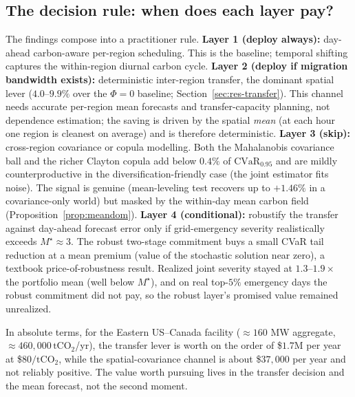 \documentclass[12pt]{article}
\newcommand{\CVaR}{\mathrm{CVaR}}
\begin{document}
\subsection{The decision rule: when does each layer pay?}\label{sec:practical}
The findings compose into a practitioner rule. \textbf{Layer 1 (deploy always):}
day-ahead carbon-aware per-region scheduling. This is the baseline; temporal shifting
captures the within-region diurnal carbon cycle. \textbf{Layer 2 (deploy if migration
bandwidth exists):} deterministic inter-region transfer, the dominant spatial lever
($4.0$--$9.9\%$ over the $\Phi=0$ baseline;
Section~\ref{sec:res-transfer}). This channel needs accurate per-region mean forecasts
and transfer-capacity planning, not dependence estimation; the saving is driven by the
spatial \emph{mean} (at each hour one region is cleanest on average) and is therefore
deterministic. \textbf{Layer 3 (skip):} cross-region covariance or copula modelling. Both
the Mahalanobis covariance ball and the richer Clayton copula add below $0.4\%$ of
$\CVaR_{0.95}$ and are mildly counterproductive in the diversification-friendly case
(the joint estimator fits noise). The signal is genuine (mean-leveling test recovers up to
$+1.46\%$ in a covariance-only world) but masked by the within-day mean carbon field
(Proposition~\ref{prop:meandom}). \textbf{Layer 4 (conditional):} robustify the
transfer against day-ahead forecast error only if grid-emergency severity realistically
exceeds $M^\star\approx3$. The robust two-stage commitment buys a small CVaR tail
reduction at a mean premium (value of the stochastic solution near zero), a textbook
price-of-robustness result. Realized joint severity stayed at $1.3$--$1.9\times$ the
portfolio mean (well below $M^\star$), and on real top-$5\%$ emergency days the robust
commitment did not pay, so the robust layer's promised value remained unrealized.

In absolute terms, for the Eastern US--Canada facility ($\approx160$ MW aggregate,
$\approx460{,}000\,\text{tCO}_2$/yr), the transfer lever is worth on the order of
\$$1.7$M per year at \$$80/\text{tCO}_2$, while the spatial-covariance channel is
about \$$37{,}000$ per year and not reliably positive. The value worth pursuing lives
in the transfer decision and the mean forecast, not the second moment.
\end{document}
